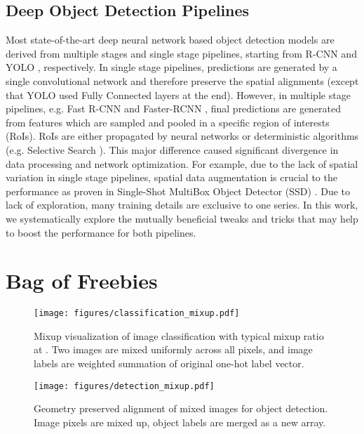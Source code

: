 \documentclass[10pt,twocolumn,letterpaper]{article}
\begin{document}
\subsection{Deep Object Detection Pipelines}
Most state-of-the-art deep neural network based object detection models are derived from multiple stages and single stage pipelines, starting from R-CNN \cite{girshick2014rich} and YOLO \cite{redmon2016you}, respectively. In single stage pipelines, predictions are generated by a single convolutional network and therefore preserve the spatial alignments (except that YOLO used Fully Connected layers at the end). However, in multiple stage pipelines, e.g. Fast R-CNN \cite{girshick2015fast} and Faster-RCNN \cite{ren2015faster}, final predictions are generated from features which are sampled and pooled in a specific region of interests (RoIs). RoIs are either propagated by neural networks or deterministic algorithms (e.g. Selective Search \cite{uijlings2013selective}). This major difference caused significant divergence in data processing and network optimization. For example, due to the lack of spatial variation in single stage pipelines, spatial data  augmentation is crucial to the performance as proven in Single-Shot MultiBox Object Detector (SSD) \cite{liu2016ssd}. Due to lack of exploration, many training details are exclusive to one series. In this work, we systematically explore the mutually beneficial tweaks and tricks that may help to boost the performance for both pipelines.

\section{Bag of Freebies}

\begin{figure*}[t!]
  \centering
    \texttt{[image: figures/classification\_mixup.pdf]}
  \caption{Mixup visualization of image classification with typical mixup ratio at . Two images are mixed uniformly across all pixels, and image labels are weighted summation of original one-hot label vector. }
  \label{fig:classification_mixup}
\end{figure*}


\begin{figure*}[t!]
  \centering
    \texttt{[image: figures/detection\_mixup.pdf]}
  \caption{Geometry preserved alignment of mixed images for object detection. Image pixels are mixed up, object labels are merged as a new array.}
  \label{fig:det_mixup}
\end{figure*}
\end{document}
